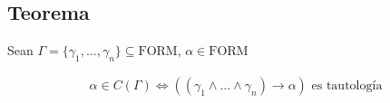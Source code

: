 \subsection{Teorema}

%
\begin{teorema}{}{}
    Sean $\Gamma = \{ \gamma_1, \dotsc, \gamma_n \} \subseteq \mathrm{FORM}$, 
    $\alpha \in \mathrm{FORM}$

    \medskip

    \begin{gather*}
        \alpha \in C(\Gamma) \iff 
        \left( (\gamma_1 \wedge \dots \wedge \gamma_n) \to \alpha  \right) 
        \text{ es tautología}
    \end{gather*}
\end{teorema}

